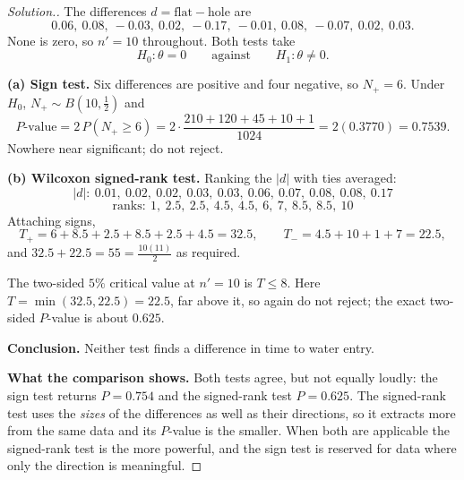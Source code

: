 \documentclass[11pt,a4paper]{article}
\theoremstyle{definition}
\newenvironment{solution}
  {\renewcommand{\qedsymbol}{}\begin{proof}[\textit{Solution}.]}
  {\end{proof}}
\begin{document}
\begin{solution}
The differences $d = \text{flat} - \text{hole}$ are
$$0.06,\ 0.08,\ -0.03,\ 0.02,\ -0.17,\ -0.01,\ 0.08,\ -0.07,\ 0.02,\ 0.03 .$$
None is zero, so $n' = 10$ throughout. Both tests take
$$H_0 : \theta = 0 \qquad\text{against}\qquad H_1 : \theta \neq 0 .$$

\textbf{(a) Sign test.} Six differences are positive and four negative, so
$N_{+} = 6$. Under $H_0$, $N_{+} \sim B\!\left(10,\tfrac12\right)$ and
$$P\text{-value} = 2\,P\left(N_{+} \geq 6\right)
= 2\cdot\dfrac{210+120+45+10+1}{1024} = 2(0.3770) = 0.7539 .$$
Nowhere near significant; do not reject.

\textbf{(b) Wilcoxon signed-rank test.} Ranking the $\left|d\right|$ with ties
averaged:
$$\left|d\right|:\ 0.01,\ 0.02,\ 0.02,\ 0.03,\ 0.03,\ 0.06,\ 0.07,\ 0.08,\ 0.08,\ 0.17$$
$$\text{ranks}:\ 1,\ 2.5,\ 2.5,\ 4.5,\ 4.5,\ 6,\ 7,\ 8.5,\ 8.5,\ 10$$
Attaching signs,
$$T_{+} = 6 + 8.5 + 2.5 + 8.5 + 2.5 + 4.5 = 32.5,
\qquad
T_{-} = 4.5 + 10 + 1 + 7 = 22.5,$$
and $32.5 + 22.5 = 55 = \frac{10(11)}{2}$ as required.

The two-sided $5\%$ critical value at $n' = 10$ is $T \leq 8$. Here
$T = \min(32.5, 22.5) = 22.5$, far above it, so again do not reject; the exact
two-sided $P$-value is about $0.625$.

\textbf{Conclusion.} Neither test finds a difference in time to water entry.

\textbf{What the comparison shows.} Both tests agree, but not equally loudly: the
sign test returns $P = 0.754$ and the signed-rank test $P = 0.625$. The signed-rank
test uses the \emph{sizes} of the differences as well as their directions, so it
extracts more from the same data and its $P$-value is the smaller. When both are
applicable the signed-rank test is the more powerful, and the sign test is reserved
for data where only the direction is meaningful.
\end{solution}
\end{document}
